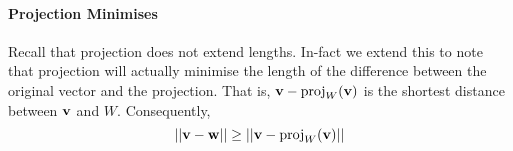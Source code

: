 \paragraph{Projection Minimises}
Recall that projection does not extend lengths.
In-fact we extend this to note that projection will actually minimise the length of
the difference between the original vector and the projection.
That is, \( \mathbf{v} - \mathrm{proj}_W(\mathbf{v}) \) is the shortest distance between \( \mathbf{v} \)
and \( W \).
Consequently, \[
    ||\mathbf{v} - \mathbf{w}|| \geq  ||\mathbf{v} - \mathrm{proj}_W(\mathbf{v})||
\]

\begin{center}
\end{center}